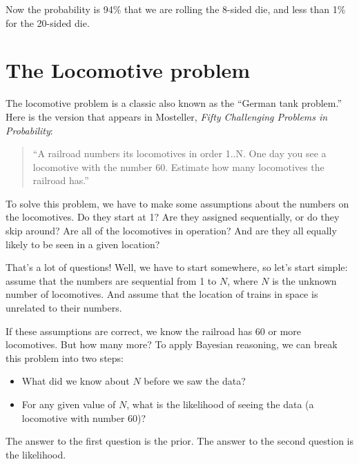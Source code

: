 \documentclass[12pt]{book}
\begin{document}
Now the probability is 94\% that we are rolling the 8-sided die,
and less than 1\% for the 20-sided die.


\section{The Locomotive problem}

The locomotive problem is a classic also
known as the ``German tank problem.''  Here is the version
that appears in Mosteller, {\it Fifty Challenging Problems in
  Probability}:

\begin{quote}
``A railroad numbers its locomotives in order 1..N.  One day you see a
locomotive with the number 60.  Estimate how many locomotives the
railroad has.''
\end{quote}

To solve this problem,
we have to make some assumptions about the numbers on the locomotives.
Do they start at 1?  Are they assigned sequentially, or do they
skip around?  Are all of the locomotives in operation?  And are
they all equally likely to be seen in a given location?

That's a lot of questions!  Well, we have to start somewhere, so let's
start simple: assume that the numbers are sequential from 1 to $N$,
where $N$ is the unknown number of locomotives.  And assume that
the location of trains in space is unrelated to their numbers.

If these assumptions are correct, we know the railroad has 60 or more
locomotives.  But how many more?  To apply Bayesian reasoning, we
can break this problem into two steps:

\begin{itemize}

\item What did we know about $N$ before we saw the
data?

\item For any given value of $N$, what is the likelihood of
seeing the data (a locomotive with number 60)?

\end{itemize}

The answer to the first question is the prior.  The answer to the
second question is the likelihood.
\end{document}
